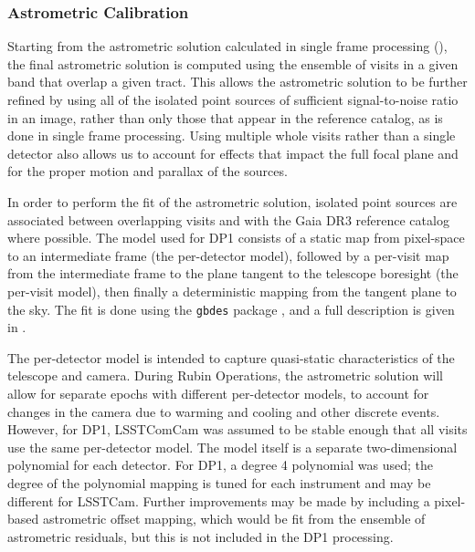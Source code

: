 \subsubsection{Astrometric Calibration}
\label{ssec:global_astrometric_calibration}
Starting from the astrometric solution calculated in single frame processing (), the final astrometric solution is computed using the ensemble of visits in a given band that overlap a given \gls{tract}.
This allows the astrometric solution to be further refined by using all of the isolated point sources of sufficient signal-to-noise ratio in an image, rather than only those that appear in the reference catalog, as is done in single frame processing.
Using multiple whole visits rather than a single detector also allows us to account for effects that impact the full focal plane and for the proper motion and parallax of the sources.

In order to perform the fit of the astrometric solution, isolated point sources are associated between overlapping visits and with the Gaia \gls{DR3} \citep{2023A&A...674A...1G} reference catalog where possible.
The model used for \gls{DP1} consists of a static map from pixel-space to an intermediate frame (the per-detector model), followed by a per-visit map from the intermediate frame to the plane tangent to the telescope boresight (the per-visit model), then finally a deterministic mapping from the tangent plane to the sky.
The fit is done using the \texttt{gbdes} package \citep{Bernstein2017}, and a full description is given in \citet{dmtn-266}.

The per-detector model is intended to capture quasi-static characteristics of the telescope and \gls{camera}. 
During \gls{Rubin Operations}, the astrometric solution will allow for separate epochs with different per-detector models, to account for changes in the camera due to warming and cooling and other discrete events.
However, for \gls{DP1}, \gls{LSSTComCam} was assumed to be stable enough that all visits use the same per-detector model. The model itself is a separate two-dimensional polynomial for each detector.
For \gls{DP1}, a degree 4 polynomial was used; the degree of the polynomial mapping is tuned for each instrument and may be different for LSSTCam.
Further improvements may be made by including a pixel-based astrometric offset mapping, which would be fit from the ensemble of astrometric residuals, but this is not included in the \gls{DP1} processing.


